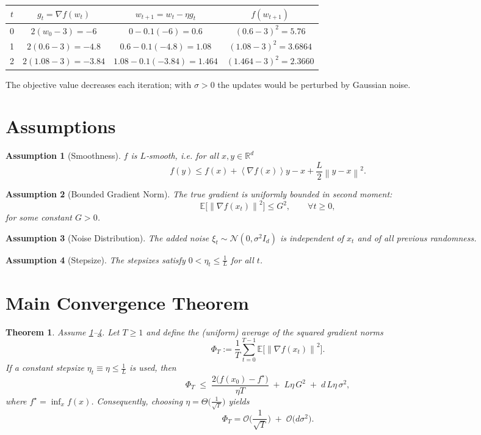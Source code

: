 \documentclass{article}
\newtheorem{theorem}{Theorem}
\newtheorem{assumption}{Assumption}
\newcommand{\E}{\mathbb{E}}
\newcommand{\norm}[1]{\left\|#1\right\|}
\newcommand{\inner}[1]{\left\langle #1 \right\rangle}
\begin{document}
\begin{center}
\begin{tabular}{c|c|c|c}
$t$ & $g_{t}=\nabla f(w_{t})$ & $w_{t+1}=w_{t}-\eta g_{t}$ & $f(w_{t+1})$\\ \hline
0 & $2(w_{0}-3)=-6$ & $0-0.1(-6)=0.6$ & $(0.6-3)^{2}=5.76$\\
1 & $2(0.6-3)=-4.8$ & $0.6-0.1(-4.8)=1.08$ & $(1.08-3)^{2}=3.6864$\\
2 & $2(1.08-3)=-3.84$ & $1.08-0.1(-3.84)=1.464$ & $(1.464-3)^{2}=2.3660$\\
\end{tabular}
\end{center}
The objective value decreases each iteration; with $\sigma>0$ the updates would be perturbed by Gaussian noise.

\newpage
\section*{Assumptions}
\begin{assumption}[Smoothness]\label{ass:smooth}
$f$ is $L$‑smooth, i.e. for all $x,y\in\mathbb{R}^{d}$
\[
f(y)\le f(x)+\inner{\nabla f(x)}{y-x}+\frac{L}{2}\norm{y-x}^{2}.
\]
\end{assumption}
\begin{assumption}[Bounded Gradient Norm]\label{ass:gradbound}
The true gradient is uniformly bounded in second moment:
\[
\E\big[\norm{\nabla f(x_{t})}^{2}\big]\le G^{2},\qquad \forall t\ge0,
\]
for some constant $G>0$.
\end{assumption}
\begin{assumption}[Noise Distribution]\label{ass:noise}
The added noise $\xi_{t}\sim\mathcal{N}(0,\sigma^{2}I_{d})$ is independent of $x_{t}$ and of all previous randomness.
\end{assumption}
\begin{assumption}[Stepsize]\label{ass:stepsize}
The stepsizes satisfy $0<\eta_{t}\le \frac{1}{L}$ for all $t$.
\end{assumption}

\section*{Main Convergence Theorem}
\begin{theorem}\label{thm:main}
Assume \ref{ass:smooth}–\ref{ass:stepsize}. Let $T\ge1$ and define the (uniform) average of the squared gradient norms
\[
\Phi_{T}:=\frac{1}{T}\sum_{t=0}^{T-1}\E\!\big[\norm{\nabla f(x_{t})}^{2}\big].
\]
If a constant stepsize $\eta_{t}\equiv\eta\le \frac{1}{L}$ is used, then
\[
\Phi_{T}\;\le\; \frac{2\big(f(x_{0})-f^{\star}\big)}{\eta T}
          \;+\; L\eta\,G^{2}
          \;+\; d\,L\eta\,\sigma^{2},
\tag{1}
\]
where $f^{\star}= \inf_{x}f(x)$. Consequently, choosing $\eta = \Theta\!\big(\frac{1}{\sqrt{T}}\big)$ yields
\[
\Phi_{T}= \mathcal{O}\!\Big(\frac{1}{\sqrt{T}}\Big)
           \;+\; \mathcal{O}\!\big(d\sigma^{2}\big).
\]
\end{theorem}
\end{document}
